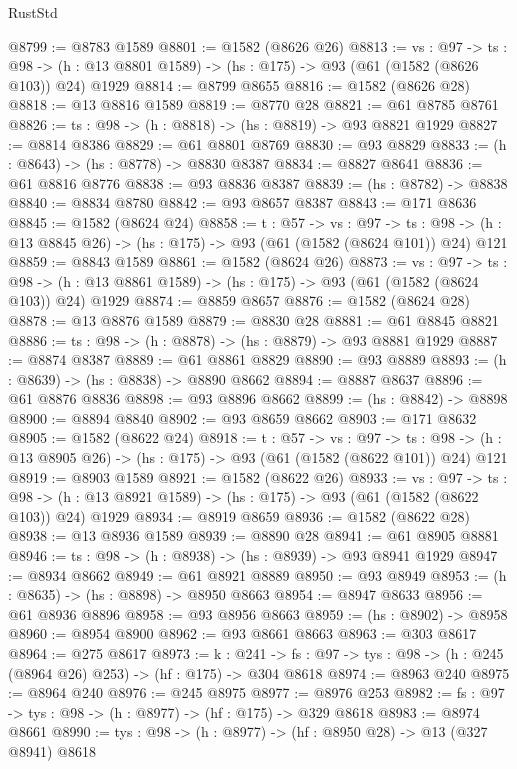 \begin{lexlean}{RustStd}
\begin{coremodule}
@8799 := @8783 @1589
@8801 := @1582 (@8626 @26)
@8813 := {vs : @97} ->
  {ts : @98} -> (h : @13 @8801 @1589) -> (hs : @175) -> @93 (@61 (@1582 (@8626 @103)) @24) @1929
@8814 := @8799 @8655
@8816 := @1582 (@8626 @28)
@8818 := @13 @8816 @1589
@8819 := @8770 @28
@8821 := @61 @8785 @8761
@8826 := {ts : @98} -> (h : @8818) -> (hs : @8819) -> @93 @8821 @1929
@8827 := @8814 @8386
@8829 := @61 @8801 @8769
@8830 := @93 @8829
@8833 := (h : @8643) -> (hs : @8778) -> @8830 @8387
@8834 := @8827 @8641
@8836 := @61 @8816 @8776
@8838 := @93 @8836 @8387
@8839 := (hs : @8782) -> @8838
@8840 := @8834 @8780
@8842 := @93 @8657 @8387
@8843 := @171 @8636
@8845 := @1582 (@8624 @24)
@8858 := {t : @57} ->
  {vs : @97} ->
  {ts : @98} -> (h : @13 @8845 @26) -> (hs : @175) -> @93 (@61 (@1582 (@8624 @101)) @24) @121
@8859 := @8843 @1589
@8861 := @1582 (@8624 @26)
@8873 := {vs : @97} ->
  {ts : @98} -> (h : @13 @8861 @1589) -> (hs : @175) -> @93 (@61 (@1582 (@8624 @103)) @24) @1929
@8874 := @8859 @8657
@8876 := @1582 (@8624 @28)
@8878 := @13 @8876 @1589
@8879 := @8830 @28
@8881 := @61 @8845 @8821
@8886 := {ts : @98} -> (h : @8878) -> (hs : @8879) -> @93 @8881 @1929
@8887 := @8874 @8387
@8889 := @61 @8861 @8829
@8890 := @93 @8889
@8893 := (h : @8639) -> (hs : @8838) -> @8890 @8662
@8894 := @8887 @8637
@8896 := @61 @8876 @8836
@8898 := @93 @8896 @8662
@8899 := (hs : @8842) -> @8898
@8900 := @8894 @8840
@8902 := @93 @8659 @8662
@8903 := @171 @8632
@8905 := @1582 (@8622 @24)
@8918 := {t : @57} ->
  {vs : @97} ->
  {ts : @98} -> (h : @13 @8905 @26) -> (hs : @175) -> @93 (@61 (@1582 (@8622 @101)) @24) @121
@8919 := @8903 @1589
@8921 := @1582 (@8622 @26)
@8933 := {vs : @97} ->
  {ts : @98} -> (h : @13 @8921 @1589) -> (hs : @175) -> @93 (@61 (@1582 (@8622 @103)) @24) @1929
@8934 := @8919 @8659
@8936 := @1582 (@8622 @28)
@8938 := @13 @8936 @1589
@8939 := @8890 @28
@8941 := @61 @8905 @8881
@8946 := {ts : @98} -> (h : @8938) -> (hs : @8939) -> @93 @8941 @1929
@8947 := @8934 @8662
@8949 := @61 @8921 @8889
@8950 := @93 @8949
@8953 := (h : @8635) -> (hs : @8898) -> @8950 @8663
@8954 := @8947 @8633
@8956 := @61 @8936 @8896
@8958 := @93 @8956 @8663
@8959 := (hs : @8902) -> @8958
@8960 := @8954 @8900
@8962 := @93 @8661 @8663
@8963 := @303 @8617
@8964 := @275 @8617
@8973 := {k : @241} ->
  {fs : @97} -> {tys : @98} -> (h : @245 (@8964 @26) @253) -> (hf : @175) -> @304 @8618
@8974 := @8963 @240
@8975 := @8964 @240
@8976 := @245 @8975
@8977 := @8976 @253
@8982 := {fs : @97} -> {tys : @98} -> (h : @8977) -> (hf : @175) -> @329 @8618
@8983 := @8974 @8661
@8990 := {tys : @98} -> (h : @8977) -> (hf : @8950 @28) -> @13 (@327 @8941) @8618

\end{coremodule}
\end{lexlean}
